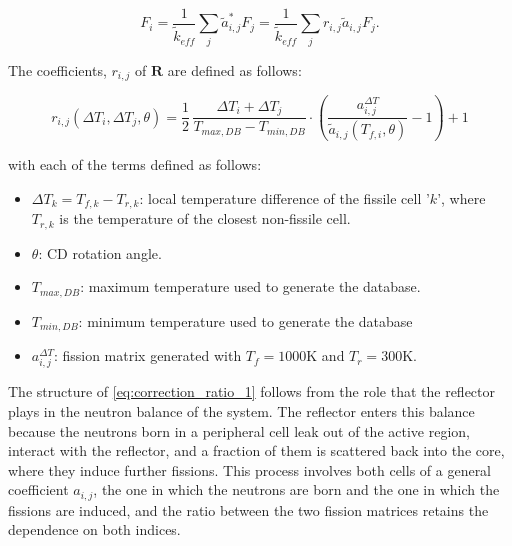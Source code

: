 \documentclass[preprint,review,12pt]{elsarticle}
\newif\ifhighlight
\newcommand{\rtwo}[1]{\ifhighlight\textcolor{revtwo}{#1}\else#1\fi}
\newcommand{\rtwocolor}{\ifhighlight\color{revtwo}\fi}
\begin{document}
\begin{equation}
F_i = \frac{1}{\tilde{k}_{eff}}\sum_j \tilde{a}_{i,j}^{*}F_j = \frac{1}{\tilde{k}_{eff}}\sum_j r_{i,j}\tilde{a}_{i,j}F_j.
\label{eq:fission_source_with_correction_calculation}
\end{equation}

The coefficients, $r_{i,j}$ of $\textbf{R}$ are defined as follows:

\begin{equation}
\rtwocolor r_{i,j}(\Delta T_i, \Delta T_j, \theta) = \frac{1}{2}\,\frac{\Delta T_i + \Delta T_j}{T_{max,DB} - T_{min,DB}} \cdot \left( \frac{ a_{i,j}^{\Delta T}}{\tilde{a}_{i,j}(T_{f,i}, \theta)} - 1 \right) + 1
\label{eq:correction_ratio_1}
\end{equation}

with each of the terms defined as follows:

\begin{itemize}
    \item \rtwo{$\Delta T_k = T_{f,k} - T_{r,k}$: local temperature difference of the fissile cell '$k$', where $T_{r,k}$ is the temperature of the closest non-fissile cell.}
    \item $ \theta $: CD rotation angle.
    \item $T_{max,DB}$: maximum temperature used to generate the database.
    \item $T_{min,DB}$: minimum temperature used to generate the database
    \item $a_{i,j}^{\Delta T}$: fission matrix generated with $T_{f}=1000$K and $T_{r}=300$K.
\end{itemize}

\rtwo{The structure of \cref{eq:correction_ratio_1} follows from the role that the reflector plays in the neutron balance of the system. The reflector enters this balance because the neutrons born in a peripheral cell leak out of the active region, interact with the reflector, and a fraction of them is scattered back into the core, where they induce further fissions. This process involves both cells of a general coefficient $a_{i,j}$, the one in which the neutrons are born and the one in which the fissions are induced, and the ratio between the two fission matrices retains the dependence on both indices.}
\end{document}

